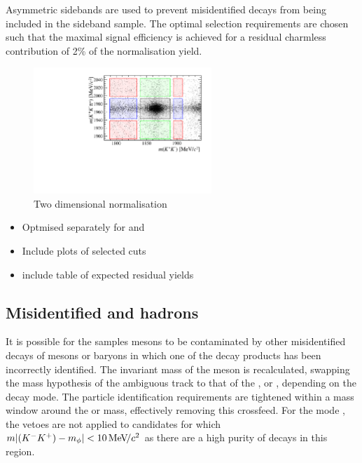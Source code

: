 Asymmetric \Dzb sidebands are used to prevent misidentified \decay{\Bp}{\Dsp (\decay{\Dzb}{\Km\pip})} decays from being included in the sideband sample.
The optimal selection requirements are chosen such that the maximal signal efficiency is achieved for a residual charmless contribution of 2\% of the normalisation yield.

\begin{figure}[!h]
    \centering
        \includegraphics[width=0.6\textwidth]{figs/Selection/B2DsD0_2D_mass_Ds2KKPiRun2.pdf}
        \caption{Two dimensional normalisation}
    \label{fig:2d_normalisation}   
\end{figure}


{\color{Red}
\begin{itemize}
\item Optmised separately for \decay{\Bp}{\Dsp\Kp\Km} and \decay{\Bp}{\Dsp\phiz}
\item Include plots of selected cuts
\item include table of expected residual yields 
\end{itemize}
}


\subsection{Misidentified \D and \Lc hadrons}
\label{sec:pidvetos}

It is possible for the samples \Dsp mesons to be contaminated by other misidentified decays of \Dp mesons or \Lc baryons in which one of the decay products has been incorrectly identified.
The invariant mass of the \Dsp meson is recalculated, swapping the mass hypothesis of the ambiguous track to that of the \kaon, or \proton, depending on the decay mode. 
The particle identification requirements are tightened within a mass window around the \Dp or \Lc mass, effectively removing this crossfeed. For the mode \decay{\Dsp}{\Kp\Km\pip}, the vetoes are not applied to candidates for which $m|({{K}^-}{{K}^+})-m_{\phi}| < 10{\mathrm{\,Me\kern -0.1em V\!/}c^2}$ as there are a high purity of \decay{\Dsp}{\Kp\Km\pip} decays in this region.

